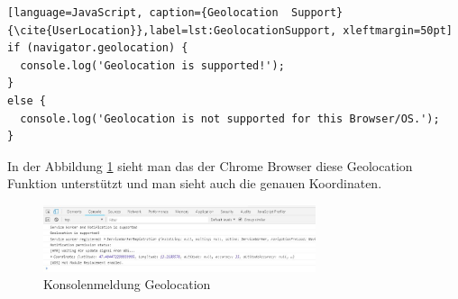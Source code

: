 \begin{lstlisting}[language=JavaScript, caption={Geolocation  Support} {\cite{UserLocation}},label=lst:GeolocationSupport, xleftmargin=50pt]
if (navigator.geolocation) {
  console.log('Geolocation is supported!');
}
else {
  console.log('Geolocation is not supported for this Browser/OS.');
}
\end{lstlisting}

In der Abbildung \ref{fig:GeoSupport} sieht man das der Chrome Browser diese Geolocation Funktion unterstützt und man sieht auch die genauen Koordinaten.

\begin{figure}[h]
	\centering
	\includegraphics[width=8cm]{BilderAllgemein/Geolocation/GeoSupport.jpg}\medskip
	\caption{Konsolenmeldung Geolocation}
	\label{fig:GeoSupport}
\end{figure}







